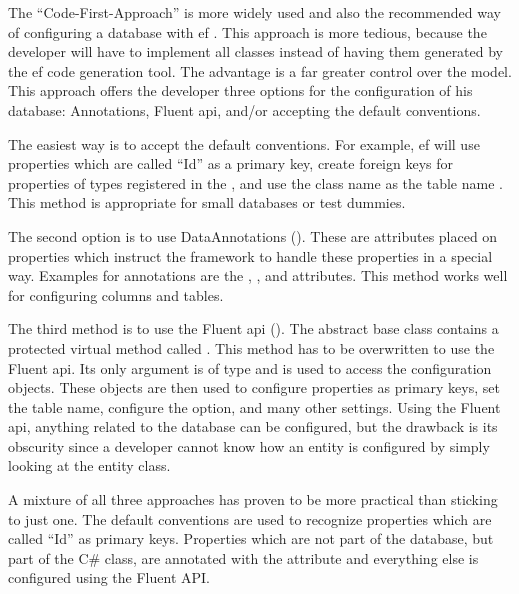The \enquote{Code-First-Approach} is more widely used and also the recommended way of configuring a database with \gls{ef} \cite{efCreateModel}. This approach is more tedious, because the developer will have to implement all classes instead of having them generated by the \gls{ef} code generation tool. The advantage is a far greater control over the model. This approach offers the developer three options for the configuration of his database: Annotations, Fluent \gls{api}, and/or accepting the default conventions.

The easiest way is to accept the default conventions. For example, \gls{ef} will use properties which are called \enquote{Id} as a primary key, create foreign keys for properties of types registered in the , and use the class name as the table name \cite{efConventions}. This method is appropriate for small databases or test dummies.

The second option is to use DataAnnotations (). These are attributes placed on properties which instruct the framework to handle these properties in a special way. Examples for annotations are the \lstcode{[Key]}, \lstcode{[ForeignKey]}, and \lstcode{[NotMapped]} attributes. This method works well for configuring columns and tables.


The third method is to use the Fluent \gls{api} (). The  abstract base class contains a protected virtual method called . This method has to be overwritten to use the Fluent \gls{api}. Its only argument is of type  and is used to access the  configuration objects. These  objects are then used to configure properties as primary keys, set the table name, configure the  option, and many other settings. Using the Fluent \gls{api}, anything related to the database can be configured, but the drawback is its obscurity since a developer cannot know how an entity is configured by simply looking at the entity class.


A mixture of all three approaches has proven to be more practical than sticking to just one. The default conventions are used to recognize properties which are called \enquote{Id} as primary keys. Properties which are not part of the database, but part of the C\# class, are annotated with the \lstcode{[NotMapped]} attribute and everything else is configured using the Fluent API.

